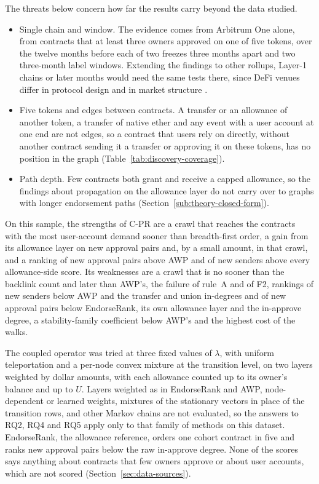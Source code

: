 
The threats below concern how far the results carry beyond the data studied.

\begin{itemize}
\item Single chain and window. The evidence comes from Arbitrum One alone, from contracts that at least three owners approved on one of five tokens, over the twelve months before each of two freezes three months apart and two three-month label windows. Extending the findings to other rollups, Layer-1 chains or later months would need the same tests there, since DeFi venues differ in protocol design \parencite{werner2022sok} and in market structure \parencite{schar2021defi}.
\item Five tokens and edges between contracts. A transfer or an allowance of another token, a transfer of native ether and any event with a user account at one end are not edges, so a contract that users rely on directly, without another contract sending it a transfer or approving it on these tokens, has no position in the graph (Table~\ref{tab:discovery-coverage}).
\item Path depth. Few contracts both grant and receive a capped allowance, so the findings about propagation on the allowance layer do not carry over to graphs with longer endorsement paths (Section~\ref{sub:theory-closed-form}).
\end{itemize}


On this sample, the strengths of \mbox{C-PR} are a crawl that reaches the contracts with the most user-account demand sooner than breadth-first order, a gain from its allowance layer on new approval pairs and, by a small amount, in that crawl, and a ranking of new approval pairs above AWP and of new senders above every allowance-side score. Its weaknesses are a crawl that is no sooner than the backlink count and later than AWP's, the failure of rule~A and of F2, rankings of new senders below AWP and the transfer and union in-degrees and of new approval pairs below EndorseRank, its own allowance layer and the in-approve degree, a stability-family coefficient below AWP's and the highest cost of the walks.

The coupled operator was tried at three fixed values of $\lambda$, with uniform teleportation and a per-node convex mixture at the transition level, on two layers weighted by dollar amounts, with each allowance counted up to its owner's balance and up to $U$. Layers weighted as in EndorseRank and AWP, node-dependent or learned weights, mixtures of the stationary vectors in place of the transition rows, and other Markov chains are not evaluated, so the answers to RQ2, RQ4 and RQ5 apply only to that family of methods on this dataset. EndorseRank, the allowance reference, orders one cohort contract in five and ranks new approval pairs below the raw in-approve degree. None of the scores says anything about contracts that few owners approve or about user accounts, which are not scored (Section~\ref{sec:data-sources}).

